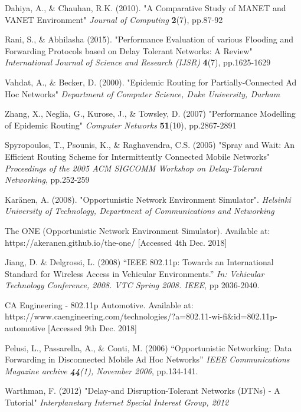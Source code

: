 \documentclass{article}
\begin{document}
\begin{thebibliography}{20}
Dahiya, A., \& Chauhan, R.K. (2010).
"A Comparative Study of MANET and VANET Environment"
\textit{Journal of Computing} \textbf{2}(7), pp.87-92

Rani, S., \& Abhilasha (2015).
"Performance Evaluation of various Flooding and
Forwarding Protocols based on Delay Tolerant
Networks: A Review"
\textit{International Journal of Science and Research (IJSR)} \textbf{4}(7), pp.1625-1629

Vahdat, A., \& Becker, D. (2000).
"Epidemic Routing for Partially-Connected Ad Hoc Networks"
\textit{Department of Computer Science, Duke University, Durham}

Zhang, X., Neglia, G., Kurose, J., \& Towsley, D. (2007)
"Performance Modelling of Epidemic Routing"
\textit{Computer Networks} \textbf{51}(10), pp.2867-2891

Spyropoulos, T., Psounis, K., \& Raghavendra, C.S. (2005)
"Spray and Wait: An Efficient Routing Scheme for
Intermittently Connected Mobile Networks"
\textit{Proceedings of the 2005 ACM SIGCOMM Workshop on Delay-Tolerant Networking}, pp.252-259

Karänen, A. (2008).
"Opportunistic Network Environment Simulator".
\textit{Helsinki University of Technology, Department of Communications and Networking}

The ONE (Opportunistic Network Environment Simulator). Available at: https://akeranen.github.io/the-one/ [Accessed 4th Dec. 2018]

Jiang, D. \& Delgrossi, L. (2008)
``IEEE 802.11p: Towards an International Standard for Wireless Access in Vehicular Environments.'' 
\textit{In: Vehicular Technology Conference, 2008. VTC Spring 2008. IEEE}, pp 2036-2040.

CA Engineering - 802.11p Automotive. Available at: https://www.caengineering.com/technologies/?a=802.11-wi-fi\&id=802.11p-automotive [Accessed 9th Dec. 2018]

Pelusi, L., Passarella, A., \& Conti, M. (2006)
``Opportunistic Networking: Data Forwarding in Disconnected Mobile Ad Hoc Networks''
\textit{IEEE Communications Magazine archive \textbf{44}(1), November 2006}, pp.134-141.

Warthman, F. (2012)
"Delay-and Disruption-Tolerant Networks (DTNs) - A Tutorial" \textit{Interplanetary Internet Special Interest Group, 2012}

\end{thebibliography}
 
\end{document}
